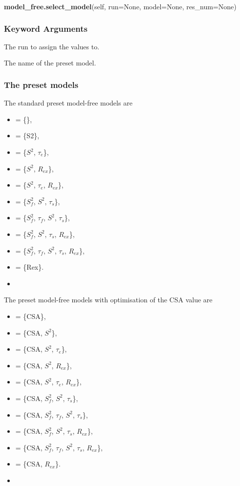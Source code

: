  \textsf{\textbf{model\_free.select\_model}(self, run=None, model=None, res\_num=None)} 

  
 \subsubsection{Keyword Arguments} 

   The run to assign the values to.   

   The name of the preset model.  

  

  
 \subsubsection{The preset models} 

 The standard preset model-free models are 
  

 \begin{itemize} 
 \item[]  = \{\},  
 \item[]  = \{S2\},  
 \item[]  = \{$S^2$, $\tau_e$\},  
 \item[]  = \{$S^2$, $R_{ex}$\},  
 \item[]  = \{$S^2$, $\tau_e$, $R_{ex}$\},  
 \item[]  = \{$S^2_f$, $S^2$, $\tau_s$\},  
 \item[]  = \{$S^2_f$, $\tau_f$, $S^2$, $\tau_s$\},  
 \item[]  = \{$S^2_f$, $S^2$, $\tau_s$, $R_{ex}$\},  
 \item[]  = \{$S^2_f$, $\tau_f$, $S^2$, $\tau_s$, $R_{ex}$\},  
 \item[]  = \{Rex\}.  
 \item[]  
 \end{itemize} 
  

 The preset model-free models with optimisation of the CSA value are 
  

 \begin{itemize} 
 \item[]  = \{CSA\},  
 \item[]  = \{CSA, $S^2$\},  
 \item[]  = \{CSA, $S^2$, $\tau_e$\},  
 \item[]  = \{CSA, $S^2$, $R_{ex}$\},  
 \item[]  = \{CSA, $S^2$, $\tau_e$, $R_{ex}$\},  
 \item[]  = \{CSA, $S^2_f$, $S^2$, $\tau_s$\},  
 \item[]  = \{CSA, $S^2_f$, $\tau_f$, $S^2$, $\tau_s$\},  
 \item[]  = \{CSA, $S^2_f$, $S^2$, $\tau_s$, $R_{ex}$\},  
 \item[]  = \{CSA, $S^2_f$, $\tau_f$, $S^2$, $\tau_s$, $R_{ex}$\},  
 \item[]  = \{CSA, $R_{ex}$\}.  
 \item[]  
 \end{itemize} 
  

